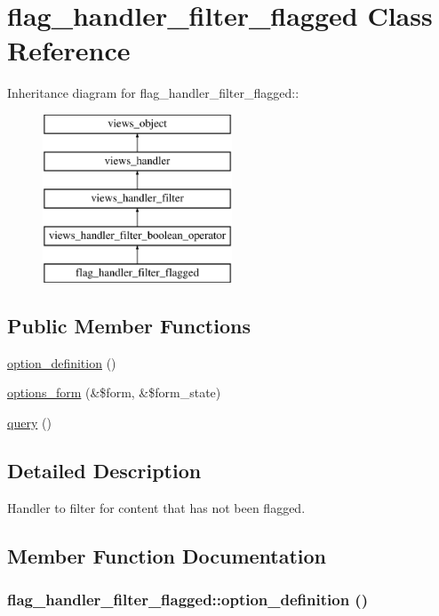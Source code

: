 \hypertarget{classflag__handler__filter__flagged}{
\section{flag\_\-handler\_\-filter\_\-flagged Class Reference}
\label{classflag__handler__filter__flagged}
}
Inheritance diagram for flag\_\-handler\_\-filter\_\-flagged::\begin{figure}[H]
\begin{center}
\leavevmode
\includegraphics[height=5cm]{classflag__handler__filter__flagged}
\end{center}
\end{figure}
\subsection*{Public Member Functions}
\begin{CompactItemize}
\item 
\hyperlink{classflag__handler__filter__flagged_c840d3d9514263a5645c551c15e1daf2}{option\_\-definition} ()
\item 
\hyperlink{classflag__handler__filter__flagged_705ed46853eba0fb4b4eb461de5264db}{options\_\-form} (\&\$form, \&\$form\_\-state)
\item 
\hyperlink{classflag__handler__filter__flagged_c01506ba4593bc1ab5b7b40f89843e82}{query} ()
\end{CompactItemize}


\subsection{Detailed Description}
Handler to filter for content that has not been flagged. 

\subsection{Member Function Documentation}
\hypertarget{classflag__handler__filter__flagged_c840d3d9514263a5645c551c15e1daf2}{
\subsubsection[{option\_\-definition}]{\setlength{\rightskip}{0pt plus 5cm}flag\_\-handler\_\-filter\_\-flagged::option\_\-definition ()}}
\label{classflag__handler__filter__flagged_c840d3d9514263a5645c551c15e1daf2}



